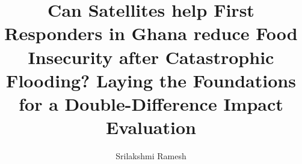 \documentclass[masters]{ucbthesis}
\begin{document}

\title{Can Satellites help First Responders in Ghana reduce Food Insecurity after Catastrophic Flooding? Laying the Foundations for a Double-Difference Impact Evaluation}
\author{Srilakshmi Ramesh}
\field{}


\maketitle

% 
\end{document}
